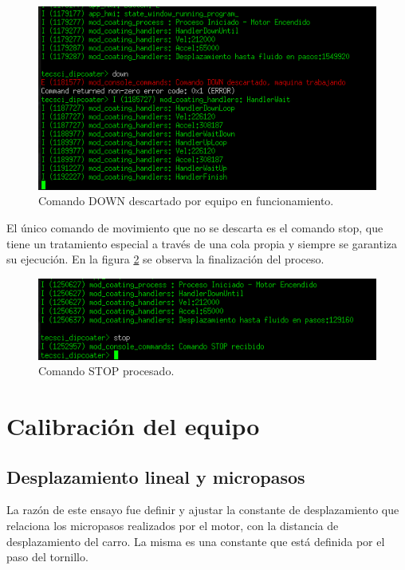 \begin{figure}[h!]
	\centering
	\includegraphics[width=1\textwidth]{./Figures/consola_4.png}
	\caption{Comando DOWN descartado por equipo en funcionamiento.}
	\label{fig:consola_comando_ok}
\end{figure}

El único comando de movimiento que no se descarta es el comando stop, que tiene un tratamiento especial a través de una cola propia y siempre se garantiza su ejecución. En la figura \ref{fig:consola_comando_false} se observa la finalización del proceso.

\begin{figure}[h!]
	\centering
	\includegraphics[width=1\textwidth]{./Figures/consola_5.png}
	\caption{Comando STOP procesado.}
	\label{fig:consola_comando_false}
\end{figure}
 
  
\section{Calibración del equipo}
\label{sec:calibración}
\subsection{Desplazamiento lineal y micropasos}

La razón de este ensayo fue definir y ajustar la constante de desplazamiento que relaciona los micropasos realizados por el motor, con la distancia de desplazamiento del carro. La misma es una constante que está definida por el paso del tornillo.

